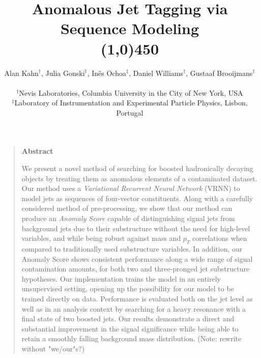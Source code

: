 \documentclass[12pt, a4paper]{article}
\title{\bf{Anomalous Jet Tagging via Sequence Modeling}\\\line(1,0){450}}
\author
{Alan Kahn$^{\dagger}$, Julia Gonski$^{\dagger}$, In\^{e}s Ochoa$^{\ddagger}$, Daniel Williams$^{\dagger}$, Gustaaf Brooijmans$^{\dagger}$\\
\\
\normalsize{$^{\dagger}$Nevis Laboratories, Columbia University in the City of New York, USA}\\
\normalsize{$^{\ddagger}$Laboratory of Instrumentation and Experimental Particle Physics, Lisbon, Portugal}
}
\date{}
\newenvironment{sciabstract}{%
\begin{quote}}
{\end{quote}}
\begin{document}
 



\baselineskip16pt

\maketitle 

\setlength{\abovedisplayskip}{5pt}
\setlength{\belowdisplayskip}{5pt}
\setlength{\abovedisplayshortskip}{0pt}
\setlength{\belowdisplayshortskip}{0pt}



\begin{sciabstract}
  \begin{center}
  {\large\bf{Abstract}\\}
  \end{center}
  
  \vspace{0.4cm}

  We present a novel method of searching for boosted hadronically
  decaying objects by treating them as anomalous elements of
  a contaminated dataset. Our method uses a \textit{Variational Recurrent Neural Network} (VRNN) to model jets as sequences of four-vector constituents. 
  Along with a carefully considered method of pre-processing, we show that our method can produce an \textit{Anomaly Score} capable of distinguishing signal jets from background jets due to their substructure without the need for high-level variables, and while being robust against mass and $p_{T}$ correlations when compared to traditionally used substructure variables. In addition, our Anomaly Score shows consistent performance along a wide range of signal contamination amounts, for both two and three-pronged jet substructure hypotheses. Our implementation trains the model in an entirely unsupervised setting, opening up the possibility for our model to be trained directly on data. Performance is evaluated both on the jet level as well as in an analysis context by searching for a heavy resonance with a final state of two boosted jets. Our results demonstrate a direct and substantial improvement in the signal significance while being able to retain a smoothly falling background mass distribution. (Note: rewrite without "we/our"s?)
    
  
\end{sciabstract}


\clearpage

\end{document}
